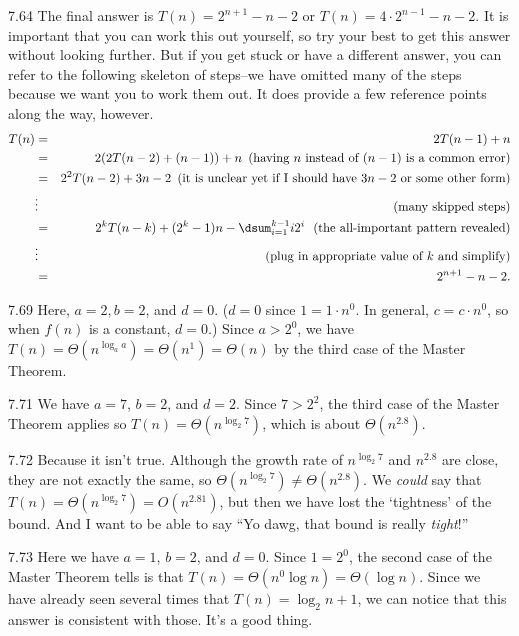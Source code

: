 \begin{Answer}{7.64}
The final answer is $T(n)=2^{n+1}-n-2$ or $T(n)=4\cdot2^{n-1}-n-2$.
It is important that you can work this out yourself, so try your best to get this
answer without looking further.  But if you get stuck or have a different answer,
you can refer to the following skeleton of steps--we have omitted many of the steps
because we want you to work them out.  It does provide a few reference points
along the way, however.
\begin{eqnarray*}
T(n)&=&2T(n-1)+n\\
&=&2(2T(n-2)+(n-1))+n\, \, \, \mbox{(having $n$ instead of $(n-1)$ is a common error)}\\
&=&2^2T(n-2)+3n-2\, \, \, \mbox{(it is unclear yet if I should have $3n-2$ or some other form)}\\
&\vdots& \, \, \, \, \, \, \mbox{(many skipped steps)}\\
&=&2^kT(n-k)+(2^k-1)n-\dsum_{i=1}^{k-1}i2^i\, \, \, \, \mbox{(the all-important pattern revealed)}\\
&\vdots& \, \, \, \, \, \, \mbox{(plug in appropriate value of $k$ and simplify)}\\
&=&2^{n+1}-n-2.
\end{eqnarray*}
\end{Answer}
\begin{Answer}{7.69}
Here, $a=2, b=2$, and $d=0$. ($d=0$ since $1=1\cdot n^0$.  In general, $c=c\cdot n^0$, so when
$f(n)$ is a constant, $d=0$.)
Since $a>2^0$, we have $T(n)=\Theta(n^{\log_aa})=\Theta(n^1)=\Theta(n)$
by the third case of the Master Theorem.
\end{Answer}
\begin{Answer}{7.71}
We have $a=7$, $b=2$, and $d=2$.  Since $7>2^2$, the third case of the
Master Theorem applies so $T(n)=\Theta(n^{\log_{2} 7})$, which is about $\Theta(n^{2.8})$.
\end{Answer}
\begin{Answer}{7.72}
Because it isn't true.  Although the growth rate of $n^{\log_{2} 7}$ and $n^{2.8}$ are
close, they are not exactly the same, so $\Theta(n^{\log_{2} 7})\neq \Theta(n^{2.8})$.
We {\em could} say that $T(n)=\Theta(n^{\log_{2} 7})=O(n^{2.81})$, but then we have lost
the `tightness' of the bound.  And I want to be able to say ``Yo dawg, that bound is really {\em tight}!''
\end{Answer}
\begin{Answer}{7.73}
Here we have $a=1$, $b=2$, and $d=0$.  Since $1=2^0$,
the second case of the Master Theorem tells is that $T(n)=\Theta(n^0\log n)=\Theta(\log n)$.
Since we have already seen several times that $T(n)=\log_2 n +1$, we can notice that
this answer is consistent with those.  It's a good thing.
\end{Answer}

